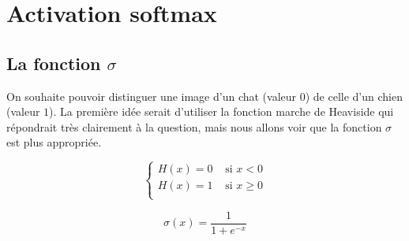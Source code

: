 \documentclass[11pt,class=report,crop=false]{standalone}
\begin{document}







\section{Activation softmax}


\subsection{La fonction $\sigma$}
On souhaite pouvoir distinguer une image d'un chat (valeur $0$) de celle d'un chien (valeur $1$). La première idée serait d'utiliser la fonction marche de Heaviside qui répondrait très clairement à la question, mais nous allons voir que la fonction $\sigma$ est plus appropriée.

\begin{minipage}{0.45\textwidth}
\begin{center}
\end{center}
$$\begin{cases}
H(x) = 0 & \text{ si } x < 0 \\
H(x) = 1  & \text{ si } x \ge 0 \\
\end{cases}$$

\end{minipage}
\qquad
\begin{minipage}{0.5\textwidth}
\begin{center}
\end{center}
$$\sigma(x) = \frac{1}{1+e^{-x}}$$
\end{minipage}
\end{document}
